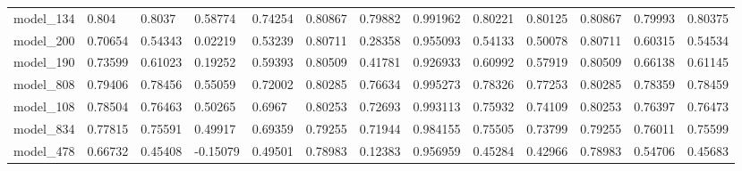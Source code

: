 \begin{tabular}{lllllllllllll}
model\_134 & 0.804   & 0.8037  & 0.58774  & 0.74254 & 0.80867     & 0.79882     & 0.991962 & 0.80221  & 0.80125   & 0.80867 & 0.79993 & 0.80375 \\
model\_200 & 0.70654 & 0.54343 & 0.02219  & 0.53239 & 0.80711     & 0.28358     & 0.955093 & 0.54133  & 0.50078   & 0.80711 & 0.60315 & 0.54534 \\
model\_190 & 0.73599 & 0.61023 & 0.19252  & 0.59393 & 0.80509     & 0.41781     & 0.926933 & 0.60992  & 0.57919   & 0.80509 & 0.66138 & 0.61145 \\
model\_808 & 0.79406 & 0.78456 & 0.55059  & 0.72002 & 0.80285     & 0.76634     & 0.995273 & 0.78326  & 0.77253   & 0.80285 & 0.78359 & 0.78459 \\
model\_108 & 0.78504 & 0.76463 & 0.50265  & 0.6967  & 0.80253     & 0.72693     & 0.993113 & 0.75932  & 0.74109   & 0.80253 & 0.76397 & 0.76473 \\
model\_834 & 0.77815 & 0.75591 & 0.49917  & 0.69359 & 0.79255     & 0.71944     & 0.984155 & 0.75505  & 0.73799   & 0.79255 & 0.76011 & 0.75599 \\
model\_478 & 0.66732 & 0.45408 & -0.15079 & 0.49501 & 0.78983     & 0.12383     & 0.956959 & 0.45284  & 0.42966   & 0.78983 & 0.54706 & 0.45683
\end{tabular}